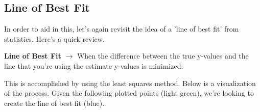 \documentclass[english, 10pt]{article}
\begin{document}
\subsection{Line of Best Fit}

In order to aid in this, let's again revisit the idea of a 'line of best fit' from statistics. Here's a quick review.\\

\begin{tcolorbox}[title=Definition:,colframe=red!75!black,colback=red!5!white,arc=0pt,fonttitle=\bfseries]
\textbf{Line of Best Fit} $\rightarrow$ When the difference between the true y-values and the line that you're using the estimate y-values is minimized.
\end{tcolorbox}

\hfill \break This is accomplished by using the least squares method. Below is a visualization of the process. Given the following plotted points (light green), we're looking to create the line of best fit (blue).\\
\end{document}
